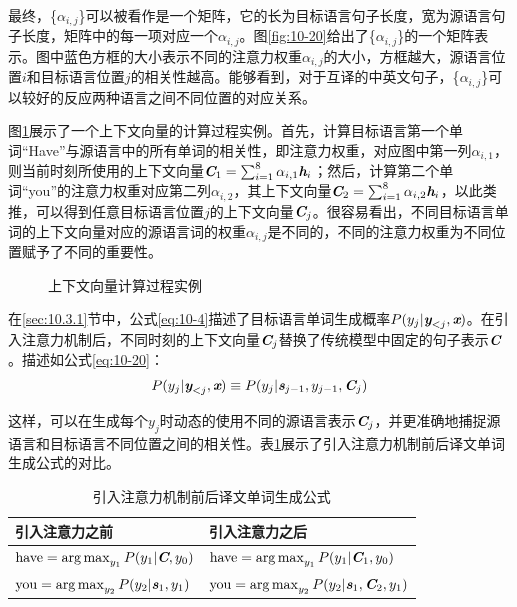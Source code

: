 \begin{itemize}
最终，\{$\alpha_{i,j}$\}可以被看作是一个矩阵，它的长为目标语言句子长度，宽为源语言句子长度，矩阵中的每一项对应一个$\alpha_{i,j}$。图\ref{fig:10-20}给出了\{$\alpha_{i,j}$\}的一个矩阵表示。图中蓝色方框的大小表示不同的注意力权重$\alpha_{i,j}$的大小，方框越大，源语言位置$i$和目标语言位置$j$的相关性越高。能够看到，对于互译的中英文句子，\{$\alpha_{i,j}$\}可以较好的反应两种语言之间不同位置的对应关系。

\vspace{0.5em}
\end{itemize}

\parinterval 图\ref{fig:10-21}展示了一个上下文向量的计算过程实例。首先，计算目标语言第一个单词“Have”与源语言中的所有单词的相关性，即注意力权重，对应图中第一列$\alpha_{i,1}$，则当前时刻所使用的上下文向量$\textbf{\em C}_1 = \sum_{i=1}^8 \alpha_{i,1} \textbf{\em h}_i$；然后，计算第二个单词“you”的注意力权重对应第二列$\alpha_{i,2}$，其上下文向量$\textbf{\em C}_2 = \sum_{i=1}^8 \alpha_{i,2} \textbf{\em h}_i$，以此类推，可以得到任意目标语言位置$j$的上下文向量$\textbf{\em C}_j$。很容易看出，不同目标语言单词的上下文向量对应的源语言词的权重$\alpha_{i,j}$是不同的，不同的注意力权重为不同位置赋予了不同的重要性。

\begin{figure}[htp]
\centering

\caption{上下文向量计算过程实例}
\label{fig:10-21}
\end{figure}

\parinterval 在\ref{sec:10.3.1}节中，公式\eqref{eq:10-4}描述了目标语言单词生成概率$ {P} (y_j | \textbf{\em y}_{<j},\textbf{\em x})$。在引入注意力机制后，不同时刻的上下文向量$\textbf{\em C}_j$替换了传统模型中固定的句子表示$\textbf{\em C}$。描述如公式\eqref{eq:10-20}：
\begin{eqnarray}
{P} (y_j | \textbf{\em y}_{<j},\textbf{\em x}) \equiv {P} (y_j | \textbf{\em s}_{j-1},y_{j-1},\textbf{\em C}_j )
\label{eq:10-20}
\end{eqnarray}

\parinterval 这样，可以在生成每个$y_j$时动态的使用不同的源语言表示$\textbf{\em C}_j$，并更准确地捕捉源语言和目标语言不同位置之间的相关性。表\ref{tab:10-7}展示了引入注意力机制前后译文单词生成公式的对比。
\vspace{-0.5em}
\begin{table}[htp]
\centering
\caption{引入注意力机制前后译文单词生成公式}
\label{tab:10-7}
\begin{tabular}{ l | l }
\rule{0pt}{13pt}	引入注意力之前			&引入注意力之后 \\ \hline
\rule{0pt}{16pt}	$\textrm{have} = \operatorname*{arg\,max}_{y_1}  {P} (y_1 | \textbf{\em C} , y_0)$		&$\textrm{have} = \operatorname*{arg\,max}_{y_1}  {P} (y_1 | \textbf{\em C}_1 , y_0)$	\\
\rule{0pt}{16pt}	$\textrm{you} = \operatorname*{arg\,max}_{y_2} {P} (y_2 | \textbf{\em s}_1 , y_1)$			&$\textrm{you} = \operatorname*{arg\,max}_{y_2} {P} (y_2 | \textbf{\em s}_1, \textbf{\em C}_2 , y_1)$	\\
\end{tabular}
\end{table}

